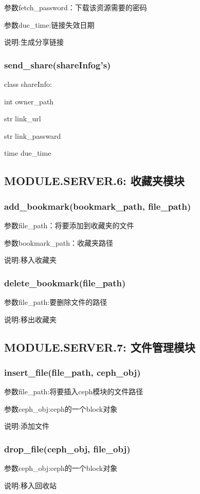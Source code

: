 参数fetch\_password：下载该资源需要的密码

参数due\_time:链接失效日期

说明:生成分享链接

\subsubsection{send\_share(shareInfog's)}
class shareInfo:

    int owner\_path

    str link\_url

    str link\_passward

    time due\_time

\subsection{MODULE.SERVER.6: 收藏夹模块}

\subsubsection{add\_bookmark(bookmark\_path, file\_path)}
参数file\_path：将要添加到收藏夹的文件

参数bookmark\_path：收藏夹路径

说明:移入收藏夹
\subsubsection{delete\_bookmark(file\_path)}
参数file\_path:要删除文件的路径
 
说明:移出收藏夹
\subsection{MODULE.SERVER.7: 文件管理模块}

\subsubsection{insert\_file(file\_path, ceph\_obj)}
参数file\_path:将要插入ceph模块的文件路径

参数ceph\_obj:ceph的一个block对象

说明:添加文件

\subsubsection{drop\_file(ceph\_obj, file\_obj)}
参数ceph\_obj:ceph的一个block对象

说明:移入回收站

